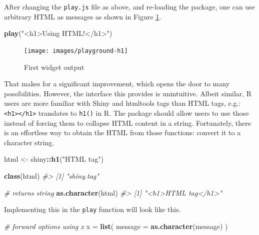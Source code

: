 \documentclass[10pt,]{krantz}
\makeatletter
\newenvironment{Shaded}{\begin{snugshade}}{\end{snugshade}}
\newcommand{\CommentTok}[1]{\textcolor[rgb]{0.37,0.37,0.37}{\textit{#1}}}
\newcommand{\DataTypeTok}[1]{\textcolor[rgb]{0.27,0.27,0.27}{#1}}
\newcommand{\KeywordTok}[1]{\textcolor[rgb]{0.27,0.27,0.27}{\textbf{#1}}}
\newcommand{\NormalTok}[1]{#1}
\newcommand{\OperatorTok}[1]{\textcolor[rgb]{0.43,0.43,0.43}{\textbf{#1}}}
\newcommand{\StringTok}[1]{\textcolor[rgb]{0.5,0.5,0.5}{#1}}
\newenvironment{kframe}{%
\medskip{}
\setlength{\fboxsep}{.8em}
 \def\at@end@of@kframe{}%
 \ifinner\ifhmode%
  \def\at@end@of@kframe{\end{minipage}}%
  \begin{minipage}{\columnwidth}%
 \fi\fi%
 \def\FrameCommand##1{\hskip\@totalleftmargin \hskip-\fboxsep
 \colorbox{shadecolor}{##1}\hskip-\fboxsep
     \hskip-\linewidth \hskip-\@totalleftmargin \hskip\columnwidth}%
 \MakeFramed {\advance\hsize-\width
   \@totalleftmargin\z@ \linewidth\hsize
   \@setminipage}}%
 {\par\unskip\endMakeFramed%
 \at@end@of@kframe}
\renewenvironment{Shaded}{\begin{kframe}}{\end{kframe}}
\makeatother
\begin{document}
After changing the \texttt{play.js} file as above, and re-loading the package, one can use arbitrary HTML as messages as shown in Figure \ref{fig:playground-h1}.

\begin{Shaded}
\begin{Highlighting}[]
\KeywordTok{play}\NormalTok{(}\StringTok{"<h1>Using HTML!</h1>"}\NormalTok{)}
\end{Highlighting}
\end{Shaded}

\begin{figure}[H]

{\centering \texttt{[image: images/playground-h1]} 

}

\caption{First widget output}\label{fig:playground-h1}
\end{figure}

That makes for a significant improvement, which opens the door to many possibilities. However, the interface this provides is unintuitive. Albeit similar, R users are more familiar with Shiny and htmltools \citep{R-htmltools} tags than HTML tags, e.g.: \texttt{\textless{}h1\textgreater{}\textless{}/h1\textgreater{}} translates to \texttt{h1()} in R. The package should allow users to use those instead of forcing them to collapse HTML content in a string. Fortunately, there is an effortless way to obtain the HTML from those functions: convert it to a character string.

\begin{Shaded}
\begin{Highlighting}[]
\NormalTok{html <-}\StringTok{ }\NormalTok{shiny}\OperatorTok{::}\KeywordTok{h1}\NormalTok{(}\StringTok{"HTML tag"}\NormalTok{)}

\KeywordTok{class}\NormalTok{(html)}
\CommentTok{#> [1] "shiny.tag"}

\CommentTok{# returns string}
\KeywordTok{as.character}\NormalTok{(html)}
\CommentTok{#> [1] "<h1>HTML tag</h1>"}
\end{Highlighting}
\end{Shaded}

Implementing this in the \texttt{play} function will look like this.

\begin{Shaded}
\begin{Highlighting}[]
\CommentTok{# forward options using x}
\NormalTok{x =}\StringTok{ }\KeywordTok{list}\NormalTok{(}
  \DataTypeTok{message =} \KeywordTok{as.character}\NormalTok{(message)}
\NormalTok{)}
\end{Highlighting}
\end{Shaded}
\end{document}

